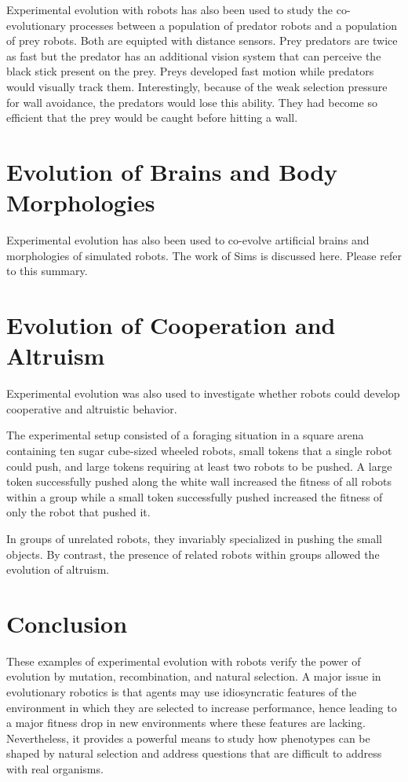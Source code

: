 \documentclass[../main.tex]{subfiles}
\begin{document}
\begin{experiment}
Experimental evolution with robots has also been used to study the co-evolutionary processes between a population of
predator robots and a population of prey robots. Both are equipted with distance sensors. Prey predators are twice as
fast but the predator has an additional vision system that can perceive the black stick present on the prey. Preys
developed fast motion while predators would visually track them. Interestingly, because of the weak selection pressure
for wall avoidance, the predators would lose this ability. They had become so efficient that the prey would be caught
before hitting a wall.
\end{experiment}

\section{Evolution of Brains and Body Morphologies}
Experimental evolution has also been used to co-evolve artificial brains and morphologies of simulated robots. The work
of Sims \cite{Sims:1994:EMB:1667943.1667946} is discussed here. Please refer to this summary.

\section{Evolution of Cooperation and Altruism}
Experimental evolution was also used to investigate whether robots could develop cooperative and altruistic behavior.

\begin{experiment}
The experimental setup consisted of a foraging situation in a square arena containing ten sugar cube-sized wheeled
robots, small tokens that a single robot could push, and large tokens requiring at least two robots to be pushed. A
large token successfully pushed along the white wall increased the fitness of all robots within a group while a small
token successfully pushed increased the fitness of only the robot that pushed it.

In groups of unrelated robots, they invariably specialized in pushing the small objects. By contrast, the presence of
related robots within groups allowed the evolution of altruism.
\end{experiment}

\section{Conclusion}
These examples of experimental evolution with robots verify the power of evolution by mutation, recombination, and
natural selection. A major issue in evolutionary robotics is that agents may use idiosyncratic features of the
environment in which they are selected to increase performance, hence leading to a major fitness drop in new
environments where these features are lacking. Nevertheless, it provides a powerful means to study how phenotypes can
be shaped by natural selection and address questions that are difficult to address with real organisms.
\end{document}
